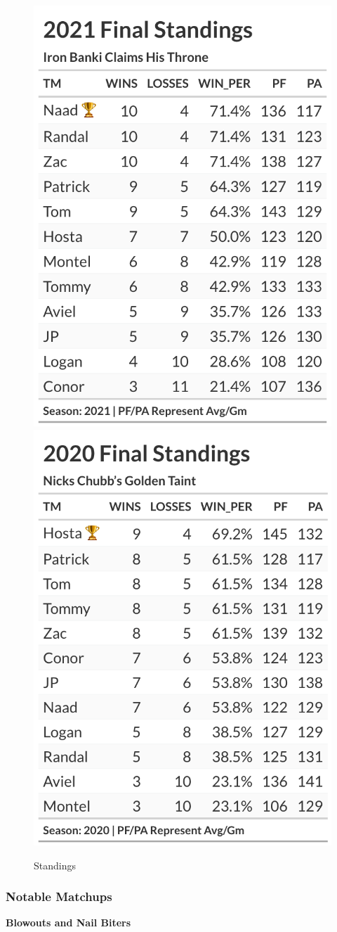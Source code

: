 \documentclass[
]{article}
\begin{document}
\begin{figure}

{\centering \includegraphics[width=0.5\linewidth,height=0.5\textheight]{output/history/2021_standings} \includegraphics[width=0.5\linewidth,height=0.5\textheight]{output/history/2020_standings} 

}

\caption{Standings}\label{fig:unnamed-chunk-3}
\end{figure}
\newpage

\hypertarget{notable-matchups}{%
\subsubsection{Notable Matchups}\label{notable-matchups}}

\textbf{Blowouts and Nail Biters}
\end{document}
